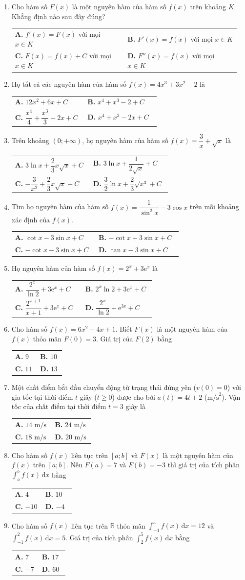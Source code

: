 \documentclass[12pt,a4paper]{article}
\makeatletter
\newcommand{\bonpa}[4]{\par\nobreak\smallskip\nobreak\noindent
\begin{tabular}{@{}p{0.48\linewidth}p{0.48\linewidth}@{}}
\textbf{A.} #1 & \textbf{B.} #2\\[8pt]
\textbf{C.} #3 & \textbf{D.} #4\end{tabular}}
\makeatother
\begin{document}
\begin{enumerate}
\item Cho hàm số $F(x)$ là một nguyên hàm của hàm số $f(x)$ trên khoảng $K$. Khẳng định nào sau đây đúng?
\bonpa{$f'(x) = F(x)$ với mọi $x \in K$}{$F'(x) = f(x)$ với mọi $x \in K$}{$F(x) = f(x) + C$ với mọi $x \in K$}{$F''(x) = f(x)$ với mọi $x \in K$}

\item Họ tất cả các nguyên hàm của hàm số $f(x) = 4x^3 + 3x^2 - 2$ là
\bonpa{$12x^2 + 6x + C$}{$x^4 + x^3 - 2 + C$}{$\dfrac{x^4}{4} + \dfrac{x^3}{3} - 2x + C$}{$x^4 + x^3 - 2x + C$}

\item Trên khoảng $(0; +\infty)$, họ nguyên hàm của hàm số $f(x) = \dfrac{3}{x} + \sqrt{x}$ là
\bonpa{$3\ln x + \dfrac{2}{3}x\sqrt{x} + C$}{$3\ln x + \dfrac{1}{2\sqrt{x}} + C$}{$-\dfrac{3}{x^2} + \dfrac{2}{3}x\sqrt{x} + C$}{$\dfrac{3}{2}\ln x + \dfrac{2}{3}\sqrt{x^3} + C$}

\item Tìm họ nguyên hàm của hàm số $f(x) = \dfrac{1}{\sin^2 x} - 3\cos x$ trên mỗi khoảng xác định của $f(x)$.
\bonpa{$\cot x - 3\sin x + C$}{$-\cot x + 3\sin x + C$}{$-\cot x - 3\sin x + C$}{$\tan x - 3\sin x + C$}

\item Họ nguyên hàm của hàm số $f(x) = 2^x + 3\mathrm{e}^x$ là
\bonpa{$\dfrac{2^x}{\ln 2} + 3\mathrm{e}^x + C$}{$2^x \ln 2 + 3\mathrm{e}^x + C$}{$\dfrac{2^{x+1}}{x+1} + 3\mathrm{e}^x + C$}{$\dfrac{2^x}{\ln 2} + \mathrm{e}^{3x} + C$}

\item Cho hàm số $f(x) = 6x^2 - 4x + 1$. Biết $F(x)$ là một nguyên hàm của $f(x)$ thỏa mãn $F(0) = 3$. Giá trị của $F(2)$ bằng
\bonpa{$9$}{$10$}{$11$}{$13$}

\item Một chất điểm bắt đầu chuyển động từ trạng thái đứng yên ($v(0) = 0$) với gia tốc tại thời điểm $t$ giây ($t \ge 0$) được cho bởi $a(t) = 4t + 2$ ($\text{m/s}^2$). Vận tốc của chất điểm tại thời điểm $t = 3$ giây là
\bonpa{$14\text{ m/s}$}{$24\text{ m/s}$}{$18\text{ m/s}$}{$20\text{ m/s}$}

\item Cho hàm số $f(x)$ liên tục trên $[a; b]$ và $F(x)$ là một nguyên hàm của $f(x)$ trên $[a; b]$. Nếu $F(a) = 7$ và $F(b) = -3$ thì giá trị của tích phân $\int_a^b f(x)\,\mathrm{d}x$ bằng
\bonpa{$4$}{$10$}{$-10$}{$-4$}

\item Cho hàm số $f(x)$ liên tục trên $\mathbb{R}$ thỏa mãn $\int_{-1}^5 f(x)\,\mathrm{d}x = 12$ và $\int_{-1}^2 f(x)\,\mathrm{d}x = 5$. Giá trị của tích phân $\int_2^5 f(x)\,\mathrm{d}x$ bằng
\bonpa{$7$}{$17$}{$-7$}{$60$}


\end{enumerate}
\end{document}
